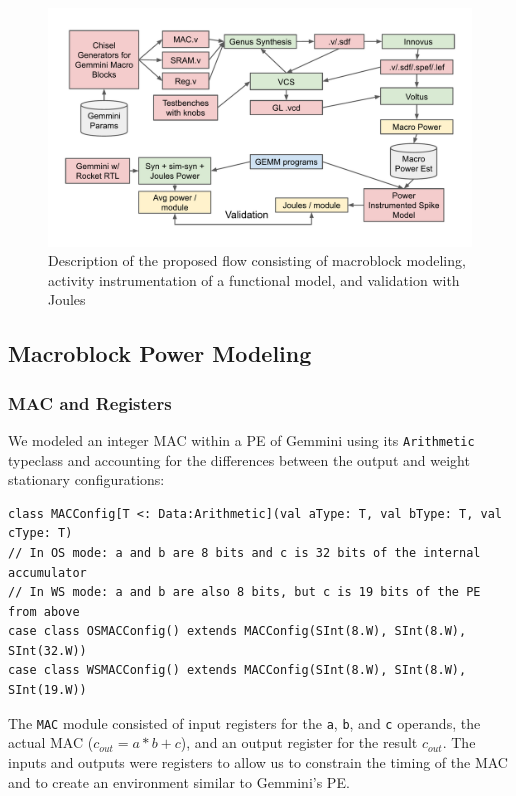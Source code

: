 \documentclass[sigconf]{acmart}
\begin{document}
\begin{figure}
  \begin{center}
    \includegraphics[width=\linewidth]{overall_flow.pdf}
  \end{center}
  \caption{Description of the proposed flow consisting of macroblock modeling, activity instrumentation of a functional model, and validation with Joules}
\end{figure}

\subsection{Macroblock Power Modeling}

\subsubsection{MAC and Registers}
We modeled an integer MAC within a PE of Gemmini using its \texttt{Arithmetic} typeclass and accounting for the differences between the output and weight stationary configurations:

\begin{verbatim}
class MACConfig[T <: Data:Arithmetic](val aType: T, val bType: T, val cType: T)
// In OS mode: a and b are 8 bits and c is 32 bits of the internal accumulator
// In WS mode: a and b are also 8 bits, but c is 19 bits of the PE from above
case class OSMACConfig() extends MACConfig(SInt(8.W), SInt(8.W), SInt(32.W))
case class WSMACConfig() extends MACConfig(SInt(8.W), SInt(8.W), SInt(19.W))
\end{verbatim}

The \texttt{MAC} module consisted of input registers for the \texttt{a}, \texttt{b}, and \texttt{c} operands, the actual MAC ($c_{out} = a*b + c$), and an output register for the result $c_{out}$.
The inputs and outputs were registers to allow us to constrain the timing of the MAC and to create an environment similar to Gemmini's PE.
\end{document}
